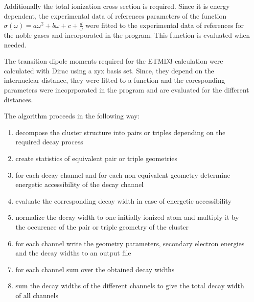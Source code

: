 Additionally the total ionization cross section is required. Since it is
energy dependent, the experimental data of references \cite{}
parameters of the function
$\sigma(\omega) = a\omega^2 + b\omega + c + \frac{d}{\omega}$ were fitted
to the experimental data of references \cite{West76,West78}
for the noble gases and incorporated in the program. This function is evaluated
when needed.

The transition dipole moments required for the ETMD3 calculation were
calculated with Dirac using a zyx basis set. Since, they depend on the
internuclear distance, they were fitted to a function and the coresponding
parameters were incoprporated in the program and are evaluated for the
different distances.

The algorithm proceeds in the following way:
\begin{enumerate}
 \item decompose the cluster structure into pairs or triples depending
       on the required decay process
 \item create statistics of equivalent pair or triple geometries
 \item for each decay channel and for each non-equivalent geometry
       determine energetic accessibility of the decay channel
 \item evaluate the corresponding decay width in case of energetic accessibility
 \item normalize the decay width to one initially ionized atom and multiply
       it by the occurence of the pair or triple geometry of the cluster
 \item for each channel write the geometry parameters, secondary electron energies
       and the decay widths to an output file
 \item for each channel sum over the obtained decay widths
 \item sum the decay widths of the different channels to give the total decay
       width of all channels
\end{enumerate}

